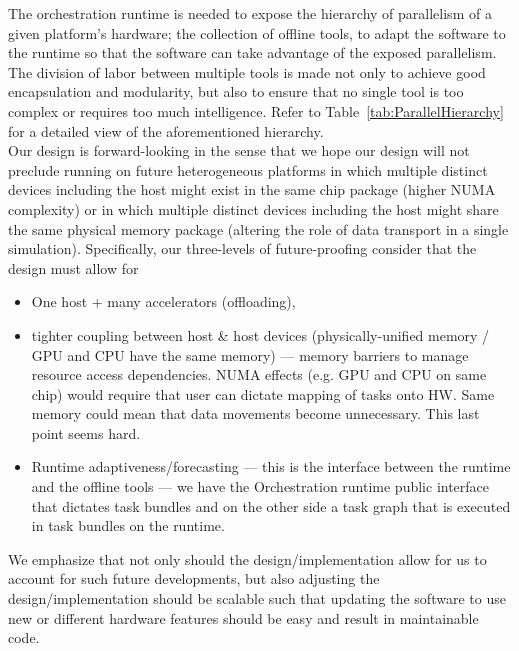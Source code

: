 \documentclass{article}
\begin{document}
The orchestration runtime is needed to expose the hierarchy of parallelism of a
given platform's hardware; the collection of offline tools, to adapt the
software to the runtime so that the software can take advantage of the exposed
parallelism.  The division of labor between multiple tools is made not only to
achieve good encapsulation and modularity, but also to ensure that no single
tool is too complex or requires too much intelligence.  Refer to
Table~\ref{tab:ParallelHierarchy} for a detailed view of the aforementioned
hierarchy.\\

Our design is forward-looking in the sense that we hope our
design will not preclude running on future heterogeneous platforms in which
multiple distinct devices including the host might exist in the same chip
package (higher NUMA complexity) or in which multiple distinct devices including
the host might share the same physical memory package (altering the role of data
transport in a single simulation).  Specifically, our three-levels of
future-proofing consider that the design must allow for
\begin{itemize}
\item{One host + many accelerators (offloading),}
\item{tighter coupling between host \& host devices
(physically-unified memory / GPU and CPU have the same memory) --- memory
barriers to manage resource access dependencies.  NUMA effects (e.g. GPU and CPU
on same chip) would require that user can dictate mapping of tasks onto HW.
Same memory could mean that data movements become unnecessary.  This last point
seems hard.}
\item{Runtime adaptiveness/forecasting --- this is the interface between the
runtime and the offline tools --- we have the Orchestration runtime public
interface that dictates task bundles and on the other side a task graph that is
executed in task bundles on the runtime.}
\end{itemize}

We emphasize that not only should the design/implementation allow for us to
account for such future developments, but also adjusting the
design/implementation should be scalable such that updating the software to use
new or different hardware features should be easy and result in maintainable
code.
\end{document}
